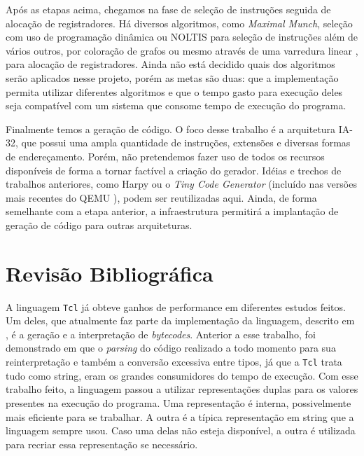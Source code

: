 Após as etapas acima, chegamos na fase de seleção de instruções
seguida de alocação de registradores. Há diversos algoritmos, como
\textit{Maximal Munch}, seleção com uso de programação dinâmica ou
NOLTIS \cite{noltis}  para seleção de instruções além de vários
outros, por coloração de grafos ou mesmo através de uma varredura
linear \cite{linear_scan_regalloc}, para alocação de registradores.
Ainda não está decidido quais dos algoritmos serão aplicados nesse
projeto, porém as metas são duas: que a implementação permita utilizar
diferentes algoritmos e que o tempo gasto para execução deles
seja compatível com um sistema que consome tempo de execução do programa.

Finalmente temos a geração de código. O foco desse trabalho é a
arquitetura IA-32, que possui uma ampla quantidade de instruções, extensões e
diversas formas de endereçamento.
Porém, não pretendemos fazer uso de todos os recursos disponíveis de
forma a tornar factível a criação do gerador.
Idéias e trechos de trabalhos anteriores, como Harpy \cite{harpy}
ou o \textit{Tiny Code Generator} (incluído nas versões mais recentes do
QEMU \cite{qemu}), podem ser reutilizadas aqui.
Ainda, de forma semelhante com a etapa anterior, a infraestrutura
permitirá a implantação de geração de código para outras arquiteturas.


\section{Revisão Bibliográfica}

A linguagem \texttt{Tcl} já obteve ganhos de performance em diferentes
estudos feitos. Um deles, que atualmente faz parte da implementação da
linguagem, descrito em \cite{tcl_bytecode}, é a geração e a
interpretação de \textit{bytecodes}. Anterior a esse trabalho, foi
demonstrado em \cite{sah_tc} que o \textit{parsing} do código
realizado a todo momento para sua reinterpretação e também a conversão
excessiva entre tipos, já que a \texttt{Tcl} trata tudo como string,
eram os grandes consumidores do tempo de execução. Com esse trabalho
feito, a linguagem passou a utilizar representações duplas para os
valores presentes na execução do programa. Uma representação é
interna, possivelmente mais eficiente para se trabalhar. A outra é a
típica representação em string que a linguagem sempre usou. Caso uma
delas não esteja disponível, a outra é utilizada para recriar essa
representação se necessário.

